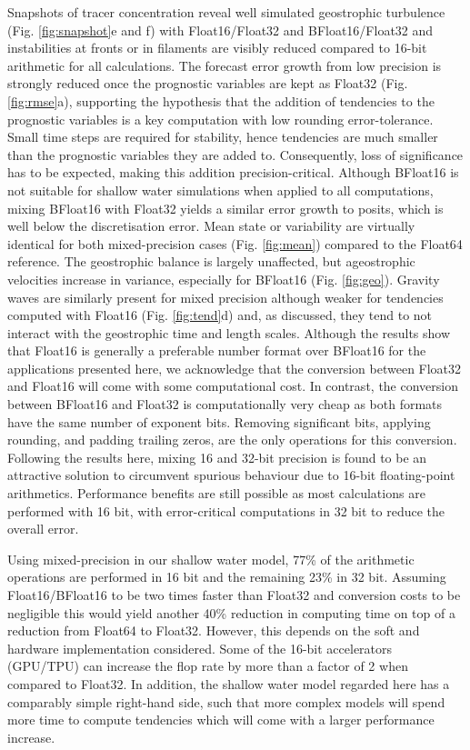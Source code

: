 Snapshots of tracer concentration reveal well simulated geostrophic turbulence (Fig. \ref{fig:snapshot}e and f) with Float16/Float32
and BFloat16/Float32 and instabilities at fronts or in filaments are visibly reduced compared to 16-bit arithmetic for all calculations.
The forecast error growth from low precision is strongly reduced once the prognostic variables are kept as Float32 (Fig. \ref{fig:rmse}a),
supporting the hypothesis that the addition of tendencies to the prognostic variables is a key computation with low rounding error-tolerance.
Small time steps are required for stability, hence tendencies are much smaller than the prognostic variables they are added to.
Consequently, loss of significance has to be expected, making this addition precision-critical.
Although BFloat16 is not suitable for shallow water simulations when applied to all computations, mixing BFloat16 with Float32 yields a
similar error growth to posits, which is well below the discretisation error. Mean state or variability are virtually identical for both mixed-precision
cases (Fig. \ref{fig:mean}) compared to the Float64 reference. The geostrophic balance is largely unaffected, but ageostrophic velocities
increase in variance, especially for BFloat16 (Fig. \ref{fig:geo}). Gravity waves are similarly present for mixed precision although weaker
for tendencies computed with Float16 (Fig. \ref{fig:tend}d) and, as discussed, they tend to not interact with the geostrophic time and
length scales. Although the results show that Float16 is generally a preferable number format over BFloat16 for the applications presented
here, we acknowledge that the conversion between Float32 and Float16 will come with some computational cost. In contrast, the
conversion between BFloat16 and Float32 is computationally very cheap as both formats have the same number of exponent bits.
Removing significant bits, applying rounding, and padding trailing zeros, are the only operations for this conversion. Following the
results here, mixing 16 and 32-bit precision is found to be an attractive solution to circumvent spurious behaviour due to 16-bit
floating-point arithmetics. Performance benefits are still possible as most calculations are performed with 16 bit, with error-critical
computations in 32 bit to reduce the overall error.

Using mixed-precision in our shallow water model, 77\% of the arithmetic operations are performed in 16 bit and the remaining
23\% in 32 bit. Assuming Float16/BFloat16 to be two times faster than Float32 and conversion costs to be negligible this would
yield another 40\% reduction in computing time on top of a reduction from Float64 to Float32. However, this depends on the soft
and hardware implementation considered. Some of the 16-bit accelerators (GPU/TPU) can increase the flop rate by more than a
factor of 2 when compared to Float32. In addition, the shallow water model regarded here has a comparably simple right-hand side,
such that more complex models will spend more time to compute tendencies which will come with a larger performance increase.

